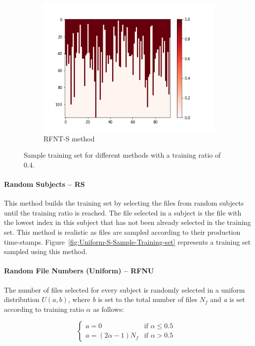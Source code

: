 \documentclass[10pt, conference, compsocconf]{IEEEtran}
\begin{document}
\begin{figure}[h!]
\begin{subfigure}[b]{0.4\linewidth}
  		\includegraphics[width=\columnwidth]{figures/5vs7_random-triangular-smallest_04_training}
  		\caption{RFNT-S method}
  		\label{fig:triangular-S-Sample-Training-set}
	\end{subfigure}
	\caption{Sample training set for different methods with a training ratio of 0.4.}		
\end{figure}

\paragraph{Random Subjects -- RS} This method builds the 
training set by selecting the files from random subjects 
until the training ratio is reached. The file selected in a 
subject is the file with the lowest index in this subject that has not 
been already selected in the training set. This method is realistic as 
files are sampled according to their production time-stamps. 
Figure~\ref{fig:Uniform-S-Sample-Training-set} represents a training 
set sampled using this method.

\paragraph{Random File Numbers (Uniform) -- RFNU}

The number of files selected for every subject is randomly selected in
a uniform distribution $U(\textit{a},\textit{b})$, where \textit{b} is set to the total
number of files $N_{f}$ and \textit{a} is set according to training ratio $\alpha$ as follows:

\[
  \begin{cases}
          \textit{a} = 0      & \text{if $\alpha \leq 0.5$ }\\
          
          \textit{a} = (2\alpha - 1) N_{f} & \text{if $\alpha > 0.5$}
  \end{cases}
\]
\end{document}
